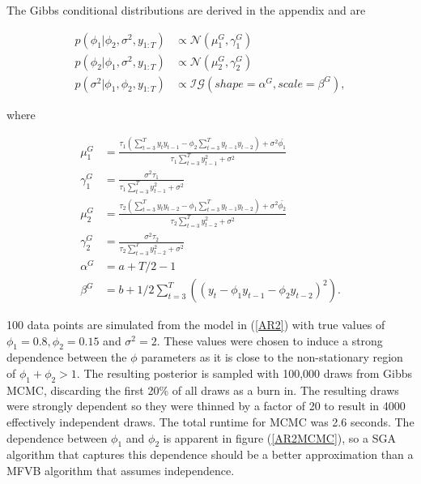 \documentclass{article}\usepackage[]{graphicx}\usepackage[]{color}
\numberwithin{equation}{section}
\begin{document}
The Gibbs conditional distributions are derived in the appendix and are

\begin{align}
p(\phi_1 | \phi_2, \sigma^2, y_{1:T}) &\propto \mathcal{N}(\mu_1^G, \gamma_1^G) \nonumber \\
p(\phi_2 | \phi_1, \sigma^2, y_{1:T}) &\propto \mathcal{N}(\mu_2^G, \gamma_2^G) \nonumber \\
p(\sigma^2 | \phi_1, \phi_2, y_{1:T}) &\propto \mathcal{IG}(shape = \alpha^G,  scale = \beta^G), \nonumber
\end{align}

where

\begin{align}
\mu_1^G &= \frac{\tau_1 (\sum_{t=3}^{T} y_t y_{t-1} - \phi_2 \sum_{t=3}^{T} y_{t-1} y_{t-2}) + \sigma^2 \bar{\phi_1}}
          {\tau_1 \sum_{t=3}^{T} y_{t-1}^2 + \sigma^2} \nonumber \\
\gamma_1^G &= \frac{\sigma^2 \tau_1}{\tau_1 \sum_{t=3}^{T} y_{t-1}^2 + \sigma^2} \nonumber \\
\mu_2^G &= \frac{\tau_2 (\sum_{t=3}^{T} y_t y_{t-2} - \phi_1 \sum_{t=3}^{T} y_{t-1} y_{t-2}) + \sigma^2 \bar{\phi_2}}
          {\tau_2 \sum_{t=3}^{T} y_{t-2}^2 + \sigma^2} \nonumber \\
\gamma_2^G &= \frac{\sigma^2 \tau_2}{\tau_2 \sum_{t=3}^{T} y_{t-2}^2 + \sigma^2} \nonumber \\
\alpha^G &= a + T/2 - 1 \nonumber \\
\beta^G &= b + 1/2 \sum_{t=3}^{T} \left((y_t - \phi_1 y_{t-1} - \phi_2 y_{t-2})^2 \right).  \nonumber
\end{align}

100 data points are simulated from the model in (\ref{AR2}) with true values of $\phi_1 = 0.8, \phi_2 = 0.15$ and $\sigma^2 = 2$. These values were chosen to induce a strong dependence between the $\phi$ parameters as it is close to the non-stationary region of $\phi_1 + \phi_2 > 1$. The resulting posterior is sampled with 100,000 draws from Gibbs MCMC, discarding the first 20\% of all draws as a burn in. The resulting draws were strongly dependent so they were thinned by a factor of 20 to result in 4000 effectively independent draws. The total runtime for MCMC was 2.6 seconds. The dependence between $\phi_1$ and $\phi_2$ is apparent in figure (\ref{AR2MCMC}), so a SGA algorithm that captures this dependence should be a better approximation than a MFVB algorithm that assumes independence.
\end{document}
